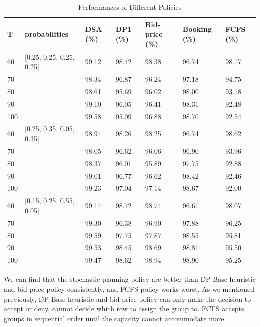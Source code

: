 \begin{table}[ht]
  \centering
  \caption{Performances of Different Policies}
  \begin{tabular}{|l|l|l|l|l|l|l|}
  \hline
   T & probabilities & DSA (\%) & DP1 (\%) & Bid-price (\%) & Booking (\%) & FCFS (\%) \\
  \hline
   60  & [0.25, 0.25, 0.25, 0.25]  & 99.12 & 98.42 & 98.38 & 96.74 & 98.17 \\
   70  &                           & 98.34 & 96.87 & 96.24 & 97.18 & 94.75 \\
   80  &                           & 98.61 & 95.69 & 96.02 & 98.00 & 93.18 \\
   90  &                           & 99.10 & 96.05 & 96.41 & 98.31 & 92.48 \\
   100 &                           & 99.58 & 95.09 & 96.88 & 98.70 & 92.54 \\
   \hline
   60  & [0.25, 0.35, 0.05, 0.35]  & 98.94 & 98.26 & 98.25 & 96.74 & 98.62 \\
   70  &                           & 98.05 & 96.62 & 96.06 & 96.90 & 93.96 \\
   80  &                           & 98.37 & 96.01 & 95.89 & 97.75 & 92.88 \\
   90  &                           & 99.01 & 96.77 & 96.62 & 98.42 & 92.46 \\
   100 &                           & 99.23 & 97.04 & 97.14 & 98.67 & 92.00 \\
  \hline
  60  & [0.15, 0.25, 0.55, 0.05]  & 99.14 & 98.72 & 98.74 & 96.61 & 98.07 \\
  70  &                           & 99.30 & 96.38 & 96.90 & 97.88 & 96.25 \\
  80  &                           & 99.59 & 97.75 & 97.87 & 98.55 & 95.81 \\
  90  &                           & 99.53 & 98.45 & 98.69 & 98.81 & 95.50 \\
  100 &                           & 99.47 & 98.62 & 98.94 & 98.90 & 95.25 \\
  \hline
  \end{tabular}
\end{table}

We can find that the stochastic planning policy are better than DP Base-heuristic and bid-price policy consistently, and FCFS policy works worst. As we mentioned previously, DP Base-heuristic and bid-price policy can only make the decision to accept or deny, cannot decide which row to assign the group to. FCFS accepts groups in sequential order until the capacity cannot accommodate more.


